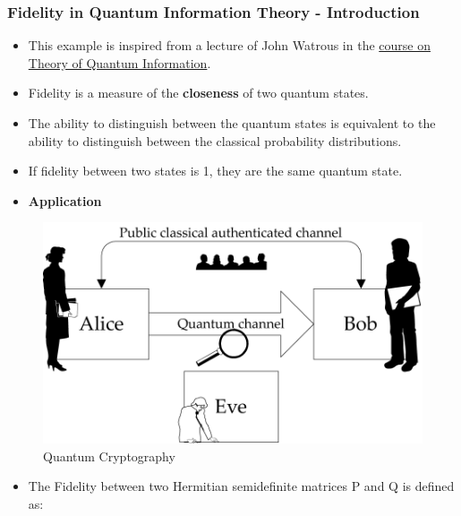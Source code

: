 \documentclass[11pt]{article}
\makeatletter
\def\maxwidth{\ifdim\Gin@nat@width>\linewidth\linewidth
    \else\Gin@nat@width\fi}
\let\Oldincludegraphics\includegraphics
\renewcommand{\includegraphics}[1]{\Oldincludegraphics[width=.8\maxwidth]{#1}}
\providecommand{\tightlist}{%
      \setlength{\itemsep}{0pt}\setlength{\parskip}{0pt}}
\makeatother
\begin{document}
\begin{Verbatim}[commandchars=\\\{\}]
\end{Verbatim}
            
    \subsubsection{Fidelity in Quantum Information Theory -
Introduction}\label{fidelity-in-quantum-information-theory---introduction}

\begin{itemize}
\item
  This example is inspired from a lecture of John Watrous in the
  \href{https://cs.uwaterloo.ca/~watrous/CS766/LectureNotes/08.pdf}{course
  on Theory of Quantum Information}.
\item
  Fidelity is a measure of the \textbf{closeness} of two quantum states.
\item
  The ability to distinguish between the quantum states is equivalent to
  the ability to distinguish between the classical probability
  distributions.
\item
  If fidelity between two states is 1, they are the same quantum state.
\end{itemize}

    \begin{itemize}
\tightlist
\item
  \textbf{Application}
\end{itemize}

\begin{figure}
\centering
\includegraphics{Fidelity.png}
\caption{Quantum Cryptography}
\end{figure}

\begin{itemize}
\tightlist
\item
  The Fidelity between two Hermitian semidefinite matrices P and Q is
  defined as:
\end{itemize}
\end{document}
